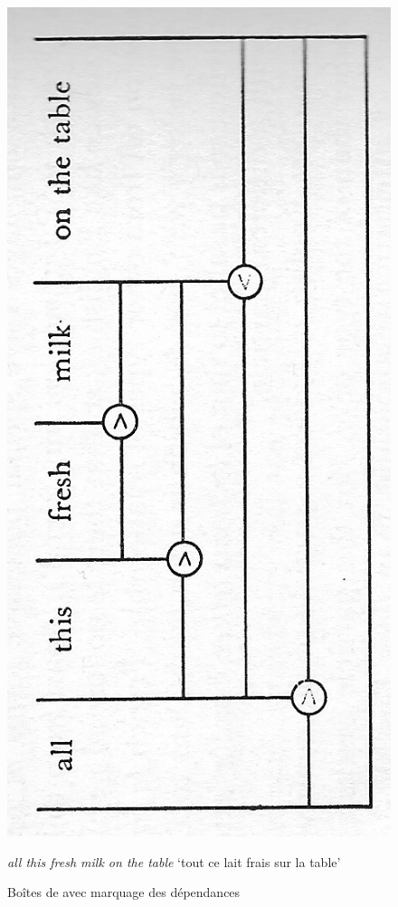 {\begin{figure}[H]
    \includegraphics[width=\textwidth]{figures/vol1syntaxe2-img025.png}
    \caption{Boîtes de \citealt{hockett1958course} avec marquage des dépendances}
    \textit{all this fresh milk on the table} ‘tout ce lait frais sur la table’
    \label{fig:hockett2}
\end{figure}

}
